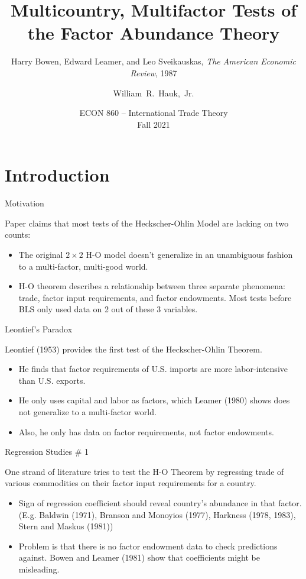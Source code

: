 \documentclass[aspectratio=169]{beamer}
\title[Bowen, Leamer, and Sveikauskas (1987)] %
{Multicountry, Multifactor Tests of the Factor Abundance Theory}
\subtitle{Harry Bowen, Edward Leamer, and Leo Sveikauskas, \emph{The American Economic Review}, 1987}
\author [Hauk] %
{William~R.~Hauk,~Jr.} %
\institute[UofSC] %
{
  Darla Moore School of Business\\
  University of South Carolina
}
\date[ECON 860, Fall 2021] %
{ECON 860 -- International Trade Theory\\Fall 2021}
\begin{document}
\frame{\titlepage}

\section{Introduction}
\begin{frame}{Motivation}

Paper claims that most tests of the Heckscher-Ohlin Model are lacking on two counts:

\begin{itemize}
    \item<1-> The original $ 2 \times 2 $  H-O model doesn’t generalize in an unambiguous fashion to a multi-factor, multi-good world.  
    \item<2-> H-O theorem describes a relationship between three separate phenomena: trade, factor input requirements, and factor endowments.  Most tests before BLS only used data on 2 out of these 3 variables.
\end{itemize}
    
\end{frame}


\begin{frame}{Leontief's Paradox}

Leontief (1953) provides the first test of the Heckscher-Ohlin Theorem.

\begin{itemize}
    \item<1-> He finds that factor requirements of U.S. imports are more labor-intensive than U.S. exports.
    \item<2-> He only uses capital and labor as factors, which Leamer (1980) shows does not generalize to a multi-factor world.
    \item<3-> Also, he only has data on factor requirements, not factor endowments.
\end{itemize}
    
\end{frame}


\begin{frame}{Regression Studies \# 1}

One strand of literature tries to test the H-O Theorem by regressing trade of various commodities on their factor input requirements for a country.

\begin{itemize}
    \item<1-> Sign of regression coefficient should reveal country’s abundance in that factor. (E.g. Baldwin (1971), Branson and Monoyios (1977), Harkness (1978, 1983), Stern and Maskus (1981))
    \item<2-> Problem is that there is no factor endowment data to check predictions against.  Bowen and Leamer (1981) show that coefficients might be misleading.
\end{itemize}

\end{frame}
\end{document}
